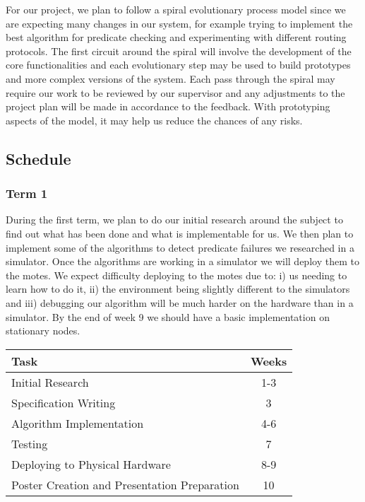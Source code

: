 \documentclass[a4paper]{article}
\begin{document}
For our project, we plan to follow a spiral evolutionary process model since we are expecting many changes in our system, for example trying to implement the best algorithm for predicate checking and experimenting with different routing protocols. The first circuit around the spiral will involve the development of the core functionalities and each evolutionary step may be used to build prototypes and more complex versions of the system. Each pass through the spiral may require our work to be reviewed by our supervisor and any adjustments to the project plan will be made in accordance to the feedback. With prototyping aspects of the model, it may help us reduce the chances of any risks.



\subsection{Schedule}

\subsubsection{Term 1}

During the first term, we plan to do our initial research around the subject to find out what has been done and what is implementable for us. We then plan to implement some of the algorithms to detect predicate failures we researched in a simulator. Once the algorithms are working in a simulator we will deploy them to the motes. We expect difficulty deploying to the motes due to: i) us needing to learn how to do it, ii) the environment being slightly different to the simulators and iii) debugging our algorithm will be much harder on the hardware than in a simulator. By the end of week 9 we should have a basic implementation on stationary nodes.

\begin{table}[H]
	\centering
	\begin{tabular}{| l | c |}
	\hline
	\textbf{Task} & \textbf{Weeks}\\
	\hline
	Initial Research & 1-3\\
	\hline
	Specification Writing & 3\\
	\hline
	Algorithm Implementation & 4-6\\
	\hline
	Testing & 7\\
	\hline
	Deploying to Physical Hardware & 8-9\\
	\hline
	Poster Creation and Presentation Preparation & 10\\
	\hline
	\end{tabular}
\end{table}
\end{document}

